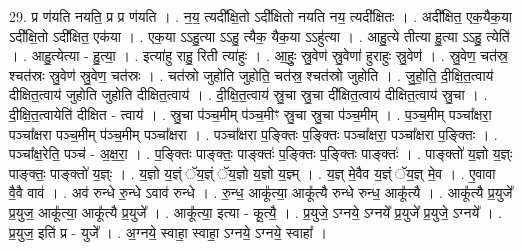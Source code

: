 \documentclass[17pt]{extarticle}
\begin{document}
29. प्र ण॑यति नयति॒ प्र प्र ण॑यति । . न॒य॒ त्यदी᳚क्षि॒तो ऽदी᳚क्षितो नयति नय॒ त्यदी᳚क्षितः । . अदी᳚क्षित॒ एक॒यैक॒या ऽदी᳚क्षि॒तो ऽदी᳚क्षित॒ एक॑या । . एक॒या ऽऽहु॒त्या ऽऽहु॒ त्यैक॒ यैक॒या ऽऽहु॑त्या । . आहु॒त्ये तीत्या हु॒त्या ऽऽहु॒ त्येति॑ । . आहु॒त्येत्या - हु॒त्या॒ । . इत्या॑हु राहु॒ रिती त्या॑हुः । . आ॒हुः॒ स्रु॒वेण॑ स्रु॒वेणा॑ हुराहुः स्रु॒वेण॑ । . स्रु॒वेण॒ चत॑स्र॒ श्चत॑स्रः स्रु॒वेण॑ स्रु॒वेण॒ चत॑स्रः । . चत॑स्रो जुहोति जुहोति॒ चत॑स्र॒ श्चत॑स्रो जुहोति । . जु॒हो॒ति॒ दी॒क्षि॒त॒त्वाय॑ दीक्षित॒त्वाय॑ जुहोति जुहोति दीक्षित॒त्वाय॑ । . दी॒क्षि॒त॒त्वाय॑ स्रु॒चा स्रु॒चा दी᳚क्षित॒त्वाय॑ दीक्षित॒त्वाय॑ स्रु॒चा । . दी॒क्षि॒त॒त्वायेति॑ दीक्षित - त्वाय॑ । . स्रु॒चा प॑ञ्च॒मीम् प॑ञ्च॒मीꣳ स्रु॒चा स्रु॒चा प॑ञ्च॒मीम् । . प॒ञ्च॒मीम् पञ्चा᳚क्षरा॒ पञ्चा᳚क्षरा पञ्च॒मीम् प॑ञ्च॒मीम् पञ्चा᳚क्षरा । . पञ्चा᳚क्षरा प॒ङ्क्तिः प॒ङ्क्तिः पञ्चा᳚क्षरा॒ पञ्चा᳚क्षरा प॒ङ्क्तिः । . पञ्चा᳚क्ष॒रेति॒ पञ्च॑ - अ॒क्ष॒रा॒ । . प॒ङ्क्तिः पाङ्क्तः॒ पाङ्क्तः॑ प॒ङ्क्तिः प॒ङ्क्तिः पाङ्क्तः॑ । . पाङ्क्तो॑ य॒ज्ञो य॒ज्ञ्ः पाङ्क्तः॒ पाङ्क्तो॑ य॒ज्ञ्ः । . य॒ज्ञो य॒ज्ञ्ं ॅय॒ज्ञ्ं ॅय॒ज्ञो य॒ज्ञो य॒ज्ञ्म् । . य॒ज्ञ् मे॒वैव य॒ज्ञ्ं ॅय॒ज्ञ् मे॒व । . ए॒वावा वै॒वै वाव॑ । . अव॑ रुन्धे रु॒न्धे ऽवाव॑ रुन्धे । . रु॒न्ध॒ आकू᳚त्या॒ आकू᳚त्यै रुन्धे रुन्ध॒ आकू᳚त्यै । . आकू᳚त्यै प्र॒युजे᳚ प्र॒युज॒ आकू᳚त्या॒ आकू᳚त्यै प्र॒युजे᳚ । . आकू᳚त्या॒ इत्या - कू॒त्यै॒ । . प्र॒युजे॒ ऽग्नये॒ ऽग्नये᳚ प्र॒युजे᳚ प्र॒युजे॒ ऽग्नये᳚ । . प्र॒युज॒ इति॑ प्र - युजे᳚ । . अ॒ग्नये॒ स्वाहा॒ स्वाहा॒ ऽग्नये॒ ऽग्नये॒ स्वाहा᳚ । \newline
\end{document}
